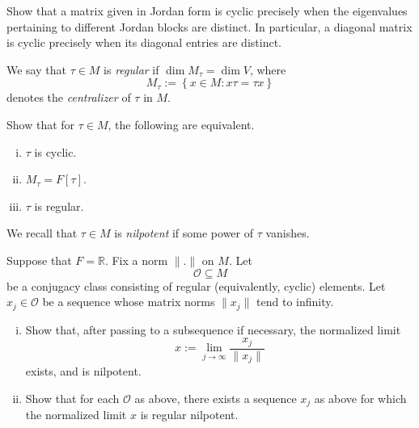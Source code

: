 \documentclass[reqno]{amsart} 
\begin{document}
\begin{exercise}\label{exercise:d1aa39bebb57}
  Show that a matrix given in Jordan form is cyclic precisely when the eigenvalues pertaining to different Jordan blocks are distinct.  In particular, a diagonal matrix is cyclic precisely when its diagonal entries are distinct.
\end{exercise}

\begin{definition}\label{definition:d1aa39bec426}
  We say that $\tau \in M$ is \emph{regular} if $\dim M_\tau = \dim V$, where
  \begin{equation*}
    M_\tau := \left\{ x \in M : x \tau = \tau x \right\}
  \end{equation*}
  denotes the \emph{centralizer} of $\tau$ in $M$.
\end{definition}

\begin{exercise}\label{exercise:d1aa39becb3a}
  Show that for $\tau \in M$, the following are equivalent.
  \begin{enumerate}[(i)]
  \item $\tau$ is cyclic.
  \item $M_\tau = F[\tau]$.
  \item $\tau$ is regular.
  \end{enumerate}
\end{exercise}

\begin{definition}\label{definition:d1aa39bed4ba}
  We recall that $\tau \in M$ is \emph{nilpotent} if some power of $\tau$ vanishes.
\end{definition}


\begin{exercise}\label{exercise:d1aa39bedb9b}
  Suppose that $F = \mathbb{R}$.  Fix a norm $\lVert . \rVert$ on $M$.  Let
  \begin{equation*}
    \mathcal{O} \subseteq M
  \end{equation*}
  be a conjugacy class consisting of regular (equivalently, cyclic) elements.  Let $x_j \in \mathcal{O}$ be a sequence whose matrix norms $\lVert x_j \rVert$ tend to infinity.
  \begin{enumerate}[(i)]
  \item Show that, after passing to a subsequence if necessary, the normalized limit
    \begin{equation*}
      x := \lim_{j \rightarrow \infty } \frac{x_j}{ \lVert x_j \rVert}
    \end{equation*}
    exists, and is nilpotent.
  \item Show that for each $\mathcal{O}$ as above, there exists a sequence $x_j$ as above for which the normalized limit $x$ is regular nilpotent.
  \end{enumerate}
\end{exercise}
\end{document}
